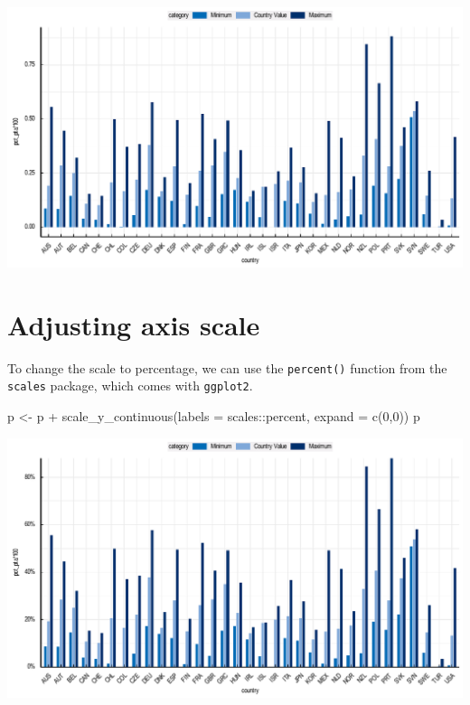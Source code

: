 \documentclass[
  11pt,
  oneside]{report}
\newenvironment{Shaded}{\begin{snugshade}}{\end{snugshade}}
\newcommand{\AttributeTok}[1]{\textcolor[rgb]{0.77,0.63,0.00}{#1}}
\newcommand{\DecValTok}[1]{\textcolor[rgb]{0.00,0.00,0.81}{#1}}
\newcommand{\FunctionTok}[1]{\textcolor[rgb]{0.00,0.00,0.00}{#1}}
\newcommand{\NormalTok}[1]{#1}
\newcommand{\OtherTok}[1]{\textcolor[rgb]{0.56,0.35,0.01}{#1}}
\newcommand{\SpecialCharTok}[1]{\textcolor[rgb]{0.00,0.00,0.00}{#1}}
\begin{document}
\begin{center}\includegraphics{book_figures/bar_3-1} \end{center}

\hypertarget{adjusting-axis-scale}{%
\section{Adjusting axis scale}\label{adjusting-axis-scale}}

To change the scale to percentage, we can use the \texttt{percent()}
function from the \texttt{scales} package, which comes with
\texttt{ggplot2}.

\begin{Shaded}
\begin{Highlighting}[]
\NormalTok{p }\OtherTok{\textless{}{-}}\NormalTok{ p }\SpecialCharTok{+}
  \FunctionTok{scale\_y\_continuous}\NormalTok{(}\AttributeTok{labels =}\NormalTok{ scales}\SpecialCharTok{::}\NormalTok{percent, }\AttributeTok{expand =} \FunctionTok{c}\NormalTok{(}\DecValTok{0}\NormalTok{,}\DecValTok{0}\NormalTok{))}
\NormalTok{p}
\end{Highlighting}
\end{Shaded}

\begin{center}\includegraphics{book_figures/bar_4-1} \end{center}
\end{document}
